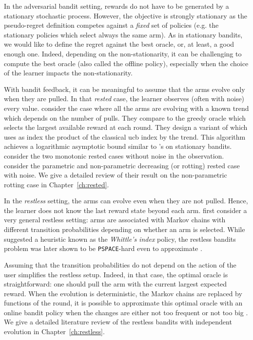 {In the adversarial bandit setting, rewards do not have to be generated by a stationary stochastic process. However, the objective is strongly stationary as the pseudo-regret definition competes against a \emph{fixed} set of policies (e.g. the stationary policies which select always the same arm). As in stationary bandits, we would like to define the regret against the best oracle, or, at least, a good enough one. Indeed, depending on the non-stationarity, it can be challenging to compute the best oracle (also called the offline policy), especially when the choice of the learner impacts the non-stationarity. 

With bandit feedback, it can be meaningful to assume that the arms evolve only when they are pulled. In that \emph{rested} case, the learner observes (often with noise) every value. \citet{bouneffouf2016multi-armed} consider the case where all the arms are evolving with a known trend which depends on the number of pulls. They compare to the greedy oracle which selects the largest available reward at each round. They design a variant of \UCB which uses as index the product of the classical ucb index by the trend. This algorithm achieves a logarithmic asymptotic bound similar to \UCB's on stationary bandits. \citet{heidari2016tight} consider the two monotonic rested cases without noise in the observation. \citet{levine2017rotting} consider the parametric and non-parametric decreasing (or rotting) rested case with noise. We give a detailed review of their result on the non-parametric rotting case in Chapter~\ref{ch:rested}. 

In the \emph{restless} setting, the arms can evolve even when they are not pulled. Hence, the learner does not know the last reward state beyond each arm. \citet{whittle1988restless} first consider a very general restless setting: arms are associated with Markov chains with different transition probabilities depending on whether an arm is selected. While \citet{whittle1988restless} suggested a heuristic known as the \emph{Whittle's index} policy, the restless bandits problem was later shown to be \texttt{PSPACE}-hard even to approximate \citep{papadimitriou1994complexity}. 

Assuming that the transition probabilities do not depend on the action of the user simplifies the restless setup. Indeed, in that case, the optimal oracle is straightforward: one should pull the arm with the current largest expected reward. When the evolution is deterministic, \ie the Markov chains are replaced by functions of the round, it is possible to approximate this optimal oracle with an online bandit policy when the changes are either not too frequent \citep{garivier2011upper-confidence-bound} or not too big \citep{besbes2014stochastic}. We give a detailed literature review of the restless bandits with independent evolution in Chapter~\ref{ch:restless}.

}
